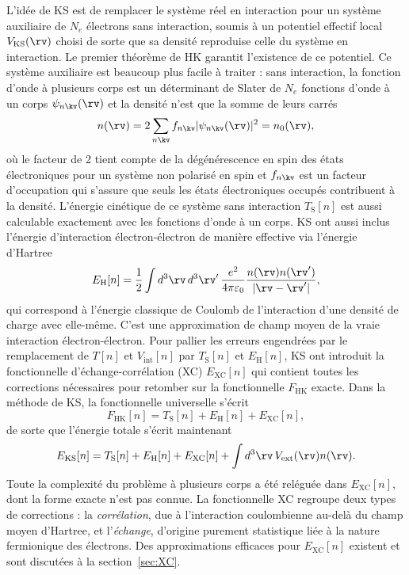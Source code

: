 L'idée de KS est de remplacer le système réel en interaction pour un système auxiliaire de $N_e$ électrons sans interaction, soumis à un potentiel effectif local $V_\text{KS}(\rv)$ choisi de sorte que sa densité reproduise celle du système en interaction. Le premier théorème de HK garantit l'existence de ce potentiel. Ce système auxiliaire est beaucoup plus facile à traiter : sans interaction, la fonction d'onde à plusieurs corps est un déterminant de Slater de $N_e$ fonctions d'onde à un corps $\psi_{n\kv}(\rv)$ et la densité n'est que la somme de leurs carrés 
\begin{equation}
    \label{eqn:c2_nKS}
    n(\rv) = 2\sum_{n\kv} f_{n\kv}|\psi_{n\kv}(\rv)|^2=n_0(\rv),
\end{equation}
où le facteur de 2 tient compte de la dégénérescence en spin des états électroniques pour un système non polarisé en spin et $f_{n\kv}$ est un facteur d'occupation qui s'assure que seuls les états électroniques occupés contribuent à la densité. L'énergie cinétique de ce système sans interaction $T_\text{S}[n]$ est aussi calculable exactement avec les fonctions d'onde à un corps. KS ont aussi inclus l'énergie d'interaction électron-électron de manière effective via l'énergie d'Hartree~\cite{hartreeWaveMechanicsAtom1928,hartreeWaveMechanicsAtom1928a,fockNaeherungsmethodeZurLoesung1930}
\begin{equation}
    \label{eqn:c2_EH}
    E_\text{H}[n]=\frac{1}{2}\int d^3\rv\,d^3\rv'\,\frac{e^2}{4\pi\varepsilon_0}\frac{n(\rv)n(\rv')}{|\rv-\rv'|},
\end{equation}
qui correspond à l'énergie classique de Coulomb de 
l'interaction d'une densité de charge avec elle-même. C'est une 
approximation de champ moyen de la vraie interaction électron-électron. Pour pallier les erreurs engendrées par le remplacement de $T[n]$ et $V_\text{int}[n]$ par $T_\text{S}[n]$ et $E_\text{H}[n]$, KS ont introduit la fonctionnelle d'échange-corrélation (XC) $E_\text{XC}[n]$ qui contient toutes les corrections nécessaires pour retomber sur la fonctionnelle $F_\text{HK}$ exacte. Dans la méthode de KS, la fonctionnelle universelle s'écrit
\begin{equation}
    \label{eqn:c2_FHK_KS}
    F_\text{HK}[n]=T_\text{S}[n]+E_\text{H}[n]+E_\text{XC}[n],
\end{equation}
de sorte que l'énergie totale s'écrit maintenant
\begin{equation}
    \label{eqn:c2_EKS}
    E_\text{KS}[n]=T_\text{S}[n]+E_\text{H}[n]+E_\text{XC}[n]+\int d^3\rv\,V_\text{ext}(\rv)n(\rv).
\end{equation}
Toute la complexité du problème à plusieurs corps a été reléguée dans $E_\text{XC}[n]$, dont la forme exacte n'est pas connue. La fonctionnelle XC regroupe deux types de corrections : la \textit{corrélation}, due à l'interaction coulombienne au-delà du champ moyen d'Hartree, et l'\textit{échange}, d'origine purement statistique liée à la nature fermionique des électrons. Des approximations efficaces pour $E_\text{XC}[n]$ existent et sont discutées à la section~\ref{sec:XC}.

